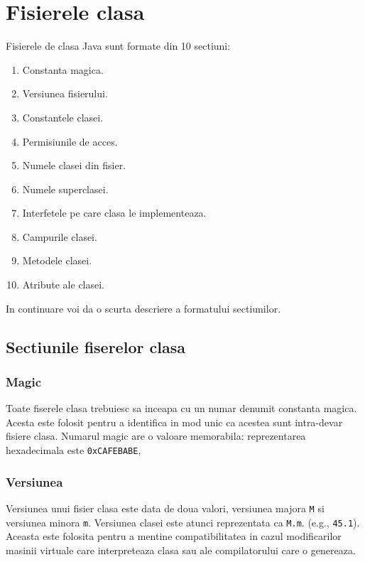 \chapter{Fisierele clasa}

Fisierele de clasa Java sunt formate din 10
sectiuni\cite{classfile_sections}:

\begin{enumerate}
\item
  Constanta magica.
\item
  Versiunea fisierului.
\item
  Constantele clasei.
\item
  Permisiunile de acces.
\item
  Numele clasei din fisier.
\item
  Numele superclasei.
\item
  Interfetele pe care clasa le implementeaza.
\item
  Campurile clasei.
\item
  Metodele clasei.
\item
  Atribute ale clasei.
\end{enumerate}

In continuare voi da o scurta descriere a formatului sectiunilor.

\section{Sectiunile fiserelor clasa}

\subsection{Magic}

Toate fiserele clasa trebuiesc sa inceapa cu un numar denumit constanta
magica. Acesta este folosit pentru a identifica in mod unic ca acestea
sunt intra-devar fisiere clasa. Numarul magic are o valoare memorabila:
reprezentarea hexadecimala este \texttt{0xCAFEBABE},

\subsection{Versiunea}

Versiunea unui fisier clasa este data de doua valori, versiunea majora
\texttt{M} si versiunea minora \texttt{m}. Versiunea clasei este atunci
reprezentata ca \texttt{M.m}. (e.g., \texttt{45.1}). Aceasta este
folosita pentru a mentine compatibilitatea in cazul modificarilor
masinii virtuale care interpreteaza clasa sau ale compilatorului care o
genereaza.

